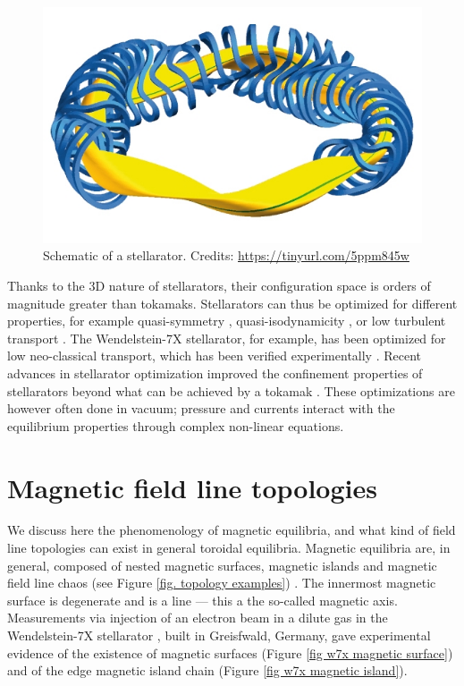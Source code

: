 \documentclass[my_thesis.tex]{subfiles}
\begin{document}
\begin{figure}
    \centering
    \includegraphics[width=\linewidth]{images/Introduction/StellaratorSketch.jpg}
    \caption{Schematic of a stellarator. Credits: \url{https://tinyurl.com/5ppm845w}}
    \label{fig stellarator sketch}
\end{figure}

Thanks to the 3D nature of stellarators, their configuration space is orders of magnitude greater than tokamaks. Stellarators can thus be optimized for different properties, for example quasi-symmetry \citep{Landreman2022}, quasi-isodynamicity \citep{goodmanConstructingPreciselyQuasiisodynamic2022},  or low turbulent transport \citep{xanthopoulosControllingTurbulencePresent2014}. The Wendelstein-7X stellarator, for example, has been optimized for low neo-classical transport, which has been verified experimentally \citep{beidlerDemonstrationReducedNeoclassical2021}. Recent advances in stellarator optimization improved the confinement properties of stellarators beyond what can be achieved by a tokamak \citep{landremanOptimizationQuasisymmetricStellarators2022}. These optimizations are however often done in vacuum; pressure and currents interact with the equilibrium properties through complex non-linear equations. 


\section{Magnetic field line topologies}
We discuss here the phenomenology of magnetic equilibria, and what kind of field line topologies can exist in general toroidal equilibria. Magnetic equilibria are, in general, composed of nested magnetic surfaces, magnetic islands and magnetic field line chaos (see Figure \ref{fig. topology examples}) \citep{helanderTheoryPlasmaConfinement2014}. The innermost magnetic surface is degenerate and is a line --- this a the so-called magnetic axis. Measurements via injection of an electron beam in a dilute gas in the Wendelstein-7X stellarator \citep{pedersenConfirmationTopologyWendelstein2016}, built in Greisfwald, Germany, gave experimental evidence of the existence of magnetic surfaces (Figure \ref{fig w7x magnetic surface}) and of the edge magnetic island chain (Figure \ref{fig w7x magnetic island}).
\end{document}
